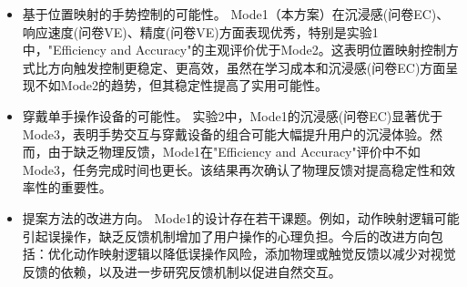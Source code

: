 \begin{itemize}
    \item 基于位置映射的手势控制的可能性。
          Mode1（本方案）在沉浸感(问卷EC)、响应速度(问卷VE)、精度(问卷VE)方面表现优秀，特别是实验1中，"Efficiency and Accuracy"的主观评价优于Mode2。这表明位置映射控制方式比方向触发控制更稳定、更高效，虽然在学习成本和沉浸感(问卷EC)方面呈现不如Mode2的趋势，但其稳定性提高了实用可能性。

    \item 穿戴单手操作设备的可能性。
          实验2中，Mode1的沉浸感(问卷EC)显著优于Mode3，表明手势交互与穿戴设备的组合可能大幅提升用户的沉浸体验。然而，由于缺乏物理反馈，Mode1在"Efficiency and Accuracy"评价中不如Mode3，任务完成时间也更长。该结果再次确认了物理反馈对提高稳定性和效率性的重要性。

    \item 提案方法的改进方向。
          Mode1的设计存在若干课题。例如，动作映射逻辑可能引起误操作，缺乏反馈机制增加了用户操作的心理负担。今后的改进方向包括：优化动作映射逻辑以降低误操作风险，添加物理或触觉反馈以减少对视觉反馈的依赖，以及进一步研究反馈机制以促进自然交互。
\end{itemize}

\clearpage

\ifx\allfiles\undefined

\fi
